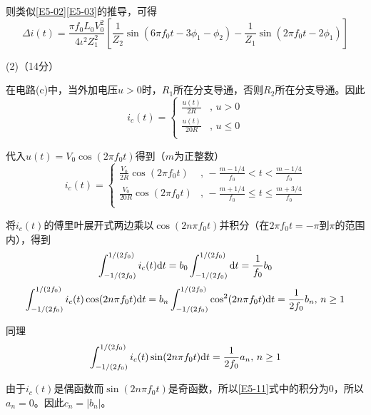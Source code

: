 \documentclass[10pt,a4paper,onecolumn,UTF8]{ctexart}
\begin{document}
	则类似\eqref{E5-02}\eqref{E5-03}的推导，可得
	\begin{equation}
		\Delta i(t)=\frac{\pi f_0L_0V_0^2}{4\iota^2Z_1^2}\left[\frac{1}{Z_2}\sin(6\pi f_0t-3\phi_1-\phi_2)-\frac{1}{Z_1}\sin(2\pi f_0t-2\phi_1)\right]
	\end{equation}
	
	(2)（14分）
	
	在电路(c)中，当外加电压$u>0$时，$R_1$所在分支导通，否则$R_2$所在分支导通。因此
	\begin{equation}
		i_c(t)=\left\{\begin{aligned}
			\frac{u(t)}{2R}&,\,u>0\\
			\frac{u(t)}{20R}&,\,u\leq0\\
		\end{aligned}\right.
	\end{equation}
	
	代入$u(t)=V_0\cos(2\pi f_0 t)$得到（$m$为正整数）
	\begin{equation}
		i_c(t)=\left\{\begin{aligned}
			\frac{V_0}{2R}\cos(2\pi f_0 t)&,\,-\frac{m-1/4}{f_0}<t<\frac{m-1/4}{f_0}\\
			\frac{V_0}{20R}\cos(2\pi f_0 t)&,\,-\frac{m+1/4}{f_0}\leq t\leq\frac{m+3/4}{f_0}\\
		\end{aligned}\right.
	\end{equation}
	
	将$i_c(t)$的傅里叶展开式两边乘以$\cos(2n\pi f_0t)$并积分（在$2\pi f_0t=-\pi$到$\pi$的范围内），得到
	\begin{equation}\label{E5-09}
		\int_{-1/(2f_0)}^{1/(2f_0)}i_c(t)\mathrm{d} t=b_0\int_{-1/(2f_0)}^{1/(2f_0)}\mathrm{d} t=\frac{1}{f_0}b_0
	\end{equation}
	\begin{equation}\label{E5-10}
		\int_{-1/(2f_0)}^{1/(2f_0)}i_c(t)\cos(2n\pi f_0t)\mathrm{d} t=b_n\int_{-1/(2f_0)}^{1/(2f_0)}\cos^2(2n\pi f_0t)\mathrm{d} t=\frac{1}{2f_0}b_n,\,n\geq1
	\end{equation}
	
	同理
	\begin{equation}\label{E5-11}
		\int_{-1/(2f_0)}^{1/(2f_0)}i_c(t)\sin(2n\pi f_0t)\mathrm{d} t=\frac{1}{2f_0}a_n,\,n\geq1
	\end{equation}
	
	由于$i_c(t)$是偶函数而$\sin(2n\pi f_0t)$是奇函数，所以\eqref{E5-11}式中的积分为0，所以$a_n=0$。因此$c_n=|b_n|$。
	
\end{document}
